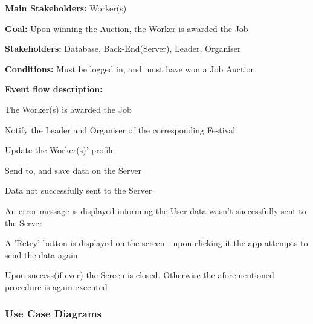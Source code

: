 			\noindent {}
			\begin{packed_item}
				\item \textbf{Main Stakeholders:} Worker(s)
				\item \textbf{Goal:} Upon winning the Auction, the Worker is awarded the Job
				\item \textbf{Stakeholders: } Database, Back-End(Server), Leader, Organiser
				\item \textbf{Conditions: } Must be logged in, and must have won a Job Auction
				\item \textbf{Event flow description: }
				\begin{packed_enum}
					\item The Worker(s) is awarded the Job
					\item Notify the Leader and Organiser of the corresponding Festival
					\item Update the Worker(s)' profile
					\item Send to, and save data on the Server 
				\end{packed_enum}
				
				\begin{packed_item}
					\item[4.a] Data not successfully sent to the Server
					\item[] \begin{packed_enum}
						\item An error message is displayed informing the User data wasn't successfully sent to the Server
						\item A 'Retry' button is displayed on the screen - upon clicking it the app attempts to send the data again
						\item Upon success(if ever) the Screen is closed. Otherwise the aforementioned procedure is again executed
					\end{packed_enum}
				\end{packed_item}
			\end{packed_item}
			
			\subsubsection{Use Case Diagrams}		
				
